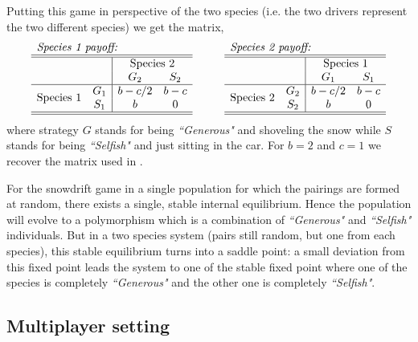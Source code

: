 \documentclass[12pt]{article}
\begin{document}
\begin{appendices}
Putting this game in perspective of the two species (i.e. the two drivers represent the two different species) we get the matrix,\\
%
\begin{equation}\label{}
\begin{array}{cc|cc}
\multicolumn{4}{l}{\textit{Species 1 payoff:}} \\
\hline\hline
& & \multicolumn{2}{c}{\text{Species 2}}\\
&	&	G_2		&	S_2	\\
\hline
 \multirow{2}{*}{Species 1} & G_1 	& b-c/2 &	b-c \\
&	S_1	&  b & 0 \\
 \hline\hline
\end{array}
\hspace{1cm}
\begin{array}{cc|cc}
\multicolumn{4}{l}{\textit{Species 2 payoff:}} \\
\hline\hline
& & \multicolumn{2}{c}{\text{Species 1}}\\
&	&	G_1		&	S_1	\\
\hline
 \multirow{2}{*}{Species 2} & G_2 	& b-c/2 &	b-c \\
&	S_2	& b & 0 \nonumber \\
 \hline\hline
\end{array}
\end{equation}
%
where strategy $G$ stands for being \textit{``Generous"} and shoveling the snow while $S$ stands for being \textit{``Selfish"} and just sitting in the car.
For $b=2$ and $c=1$ we recover the matrix used in \citep{bergstrom:PNAS:2003}.

For the snowdrift game in a single population for which the pairings are formed at random, there exists a single, stable internal equilibrium.
Hence the population will evolve to a polymorphism which is a combination of \textit{``Generous"} and \textit{``Selfish"} individuals.
But in a two species system (pairs still random, but one from each species), this stable equilibrium turns into a saddle point: a small deviation from this fixed point leads the system to one of the stable fixed point where one of the species is completely \textit{``Generous"} and the other one is completely \textit{``Selfish"}.

\subsection*{Multiplayer setting}
\label{appB}


\end{appendices}
\end{document}
